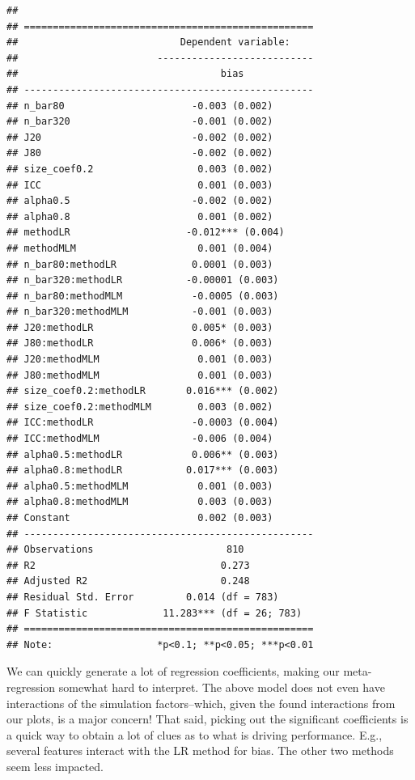 \documentclass[
]{book}
\begin{document}
\begin{verbatim}
## 
## ==================================================
##                            Dependent variable:    
##                        ---------------------------
##                                   bias            
## --------------------------------------------------
## n_bar80                      -0.003 (0.002)       
## n_bar320                     -0.001 (0.002)       
## J20                          -0.002 (0.002)       
## J80                          -0.002 (0.002)       
## size_coef0.2                  0.003 (0.002)       
## ICC                           0.001 (0.003)       
## alpha0.5                     -0.002 (0.002)       
## alpha0.8                      0.001 (0.002)       
## methodLR                    -0.012*** (0.004)     
## methodMLM                     0.001 (0.004)       
## n_bar80:methodLR             0.0001 (0.003)       
## n_bar320:methodLR           -0.00001 (0.003)      
## n_bar80:methodMLM            -0.0005 (0.003)      
## n_bar320:methodMLM           -0.001 (0.003)       
## J20:methodLR                 0.005* (0.003)       
## J80:methodLR                 0.006* (0.003)       
## J20:methodMLM                 0.001 (0.003)       
## J80:methodMLM                 0.001 (0.003)       
## size_coef0.2:methodLR       0.016*** (0.002)      
## size_coef0.2:methodMLM        0.003 (0.002)       
## ICC:methodLR                 -0.0003 (0.004)      
## ICC:methodMLM                -0.006 (0.004)       
## alpha0.5:methodLR            0.006** (0.003)      
## alpha0.8:methodLR           0.017*** (0.003)      
## alpha0.5:methodMLM            0.001 (0.003)       
## alpha0.8:methodMLM            0.003 (0.003)       
## Constant                      0.002 (0.003)       
## --------------------------------------------------
## Observations                       810            
## R2                                0.273           
## Adjusted R2                       0.248           
## Residual Std. Error         0.014 (df = 783)      
## F Statistic             11.283*** (df = 26; 783)  
## ==================================================
## Note:                  *p<0.1; **p<0.05; ***p<0.01
\end{verbatim}

We can quickly generate a lot of regression coefficients, making our meta-regression somewhat hard to interpret.
The above model does not even have interactions of the simulation factors--which, given the found interactions from our plots, is a major concern!
That said, picking out the significant coefficients is a quick way to obtain a lot of clues as to what is driving performance.
E.g., several features interact with the LR method for bias.
The other two methods seem less impacted.
\end{document}
